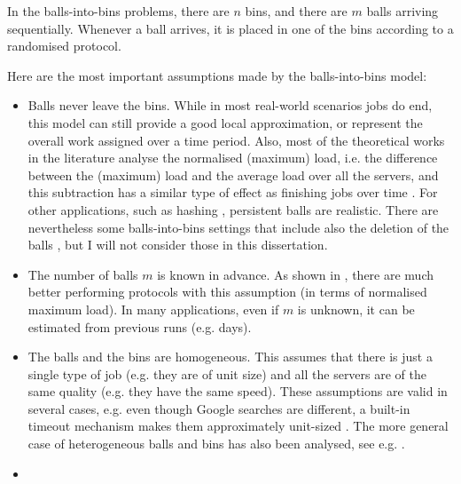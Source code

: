 \begin{definition} \label{definition: balls-into-bins}
In the balls-into-bins problems, there are $n$ bins, and there are $m$ balls arriving sequentially. Whenever a ball arrives, it is placed in one of the bins according to a randomised protocol.
\end{definition}


Here are the most important assumptions made by the balls-into-bins model:


\begin{itemize}
    \item
    Balls never leave the bins. While in most real-world scenarios jobs do end, this model can still provide a good local approximation, or represent the overall work assigned over a time period. Also, most of the theoretical works in the literature analyse the normalised (maximum) load, i.e. the difference between the (maximum) load and the average load over all the servers, and this subtraction has a similar type of effect as finishing jobs over time . For other applications, such as hashing \cite{udi2017ballsintobinslandscape}, persistent balls are realistic. There are nevertheless some balls-into-bins settings that include also the deletion of the balls \cite{azar1999twochoice}, but I will not consider those in this dissertation.
    \item
    The number of balls $m$ is known in advance. As shown in \cite{feldheim2021longtermthinning}, there are much better performing protocols with this assumption (in terms of normalised maximum load). In many applications, even if $m$ is unknown, it can be estimated from previous runs (e.g. days).
    \item
    The balls and the bins are homogeneous. This assumes that there is just a single type of job (e.g. they are of unit size) and all the servers are of the same quality (e.g. they have the same speed). These assumptions are valid in several cases, e.g. even though Google searches are different, a built-in timeout mechanism makes them approximately unit-sized . The more general case of heterogeneous balls and bins has also been analysed, see e.g. \cite{berenbrink2008weighted}.
    \item

\end{itemize}
